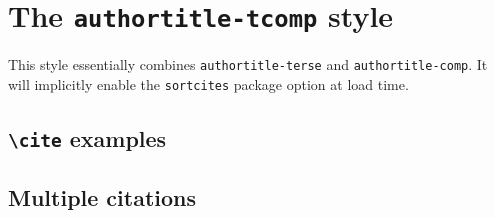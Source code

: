 \documentclass[a4paper]{article}
\newcommand{\cmd}[1]{\texttt{\textbackslash #1}}
\begin{document}
\section*{The \texttt{authortitle-tcomp} style}

This style essentially combines \texttt{authortitle-terse} and
\texttt{authortitle-comp}. It will implicitly enable the
\texttt{sortcites} package option at load time.

\subsection*{\cmd{cite} examples}

\cite{averroes/bland}

\cite{aristotle:physics}

\cite{aristotle:rhetoric}

\subsection*{Multiple citations}

\cite{aristotle:rhetoric,averroes/bland,aristotle:physics,aristotle:poetics}

\clearpage
\printbibliography
\end{document}
